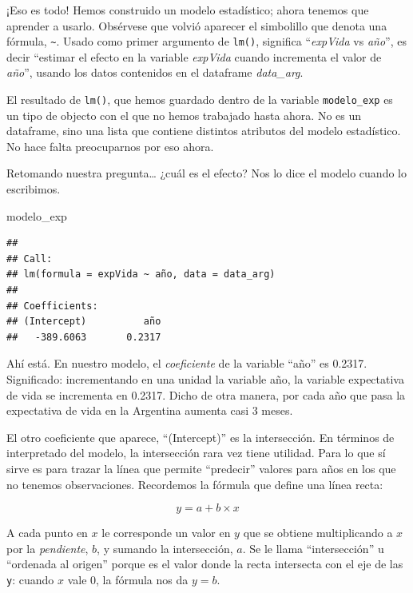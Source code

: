 \documentclass[]{book}
\newenvironment{Shaded}{\begin{snugshade}}{\end{snugshade}}
\newcommand{\NormalTok}[1]{#1}
\begin{document}
¡Eso es todo! Hemos construido un modelo estadístico; ahora tenemos que
aprender a usarlo. Obsérvese que volvió aparecer el simbolillo que
denota una fórmula, \texttt{\textasciitilde{}}. Usado como primer
argumento de \texttt{lm()}, significa ``\emph{expVida} vs \emph{año}'',
es decir ``estimar el efecto en la variable \emph{expVida} cuando
incrementa el valor de \emph{año}'', usando los datos contenidos en el
dataframe \emph{data\_arg}.

El resultado de \texttt{lm()}, que hemos guardado dentro de la variable
\texttt{modelo\_exp} es un tipo de objecto con el que no hemos trabajado
hasta ahora. No es un dataframe, sino una lista que contiene distintos
atributos del modelo estadístico. No hace falta preocuparnos por eso
ahora.

Retomando nuestra pregunta\ldots{} ¿cuál es el efecto? Nos lo dice el
modelo cuando lo escribimos.

\begin{Shaded}
\begin{Highlighting}[]
\NormalTok{modelo_exp}
\end{Highlighting}
\end{Shaded}

\begin{verbatim}
## 
## Call:
## lm(formula = expVida ~ año, data = data_arg)
## 
## Coefficients:
## (Intercept)          año  
##   -389.6063       0.2317
\end{verbatim}

Ahí está. En nuestro modelo, el \emph{coeficiente} de la variable
``año'' es 0.2317. Significado: incrementando en una unidad la variable
año, la variable expectativa de vida se incrementa en 0.2317. Dicho de
otra manera, por cada año que pasa la expectativa de vida en la
Argentina aumenta casi 3 meses.

El otro coeficiente que aparece, ``(Intercept)'' es la intersección. En
términos de interpretado del modelo, la intersección rara vez tiene
utilidad. Para lo que sí sirve es para trazar la línea que permite
``predecir'' valores para años en los que no tenemos observaciones.
Recordemos la fórmula que define una línea recta:

\[ y = a + b \times x \]

A cada punto en \(x\) le corresponde un valor en \(y\) que se obtiene
multiplicando a \(x\) por la \emph{pendiente}, \(b\), y sumando la
intersección, \(a\). Se le llama ``intersección'' u ``ordenada al
origen'' porque es el valor donde la recta intersecta con el eje de las
\texttt{y}: cuando \(x\) vale \(0\), la fórmula nos da \(y = b\).
\end{document}
